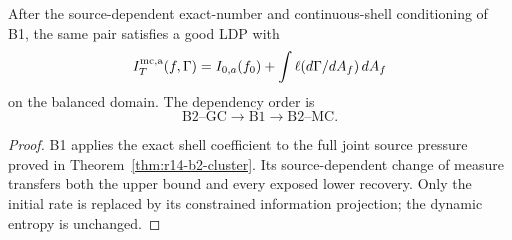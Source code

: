 \begin{theorem}
\label{thm:r14-b2-main}
After the source-dependent exact-number and continuous-shell conditioning of
B1, the same pair satisfies a good LDP with
\[
 I_T^{\rm mc,a}(f,\Gamma)
 =
 I_{0,a}(f_0)+\int\ell(d\Gamma/dA_f)\,dA_f
\]
on the balanced domain.  The dependency order is
\[
 \text{B2--GC}\longrightarrow\text{B1}
 \longrightarrow\text{B2--MC}.
\]
\end{theorem}

\begin{proof}
B1 applies the exact shell coefficient to the full joint source pressure
proved in Theorem~\ref{thm:r14-b2-cluster}.  Its source-dependent change of
measure transfers both the upper bound and every exposed lower recovery.
Only the initial rate is replaced by its constrained information projection;
the dynamic entropy is unchanged.
\end{proof}
